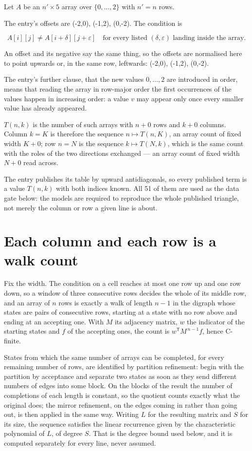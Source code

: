 \documentclass[11pt]{article}
\theoremstyle{definition}
\begin{document}
Let $A$ be an $n' \times 5$ array over $\{0,\dots,2\}$ with $n' = n$ rows.

The entry's offsets are (-2,0), (-1,2), (0,-2). The condition is

\[A[i][j] \ne A[i{+}\delta][j{+}\varepsilon]\quad\text{for every listed }(\delta,\varepsilon)\text{ landing inside the array.}\]

An offset and its negative say the same thing, so the offsets are normalised here to point upwards or, in the same row, leftwards: (-2,0), (-1,2), (0,-2).

The entry's further clause, that the new values $0,\dots,2$ are introduced in order, means that reading the array in row-major order the first occurrences of the values happen in increasing order: a value $v$ may appear only once every smaller value has already appeared.

$T(n,k)$ is the number of such arrays with $n + 0$ rows and $k + 0$ columns. Column $k = K$ is therefore the sequence $n \mapsto T(n,K)$, an array count of fixed width $K + 0$; row $n = N$ is the sequence $k \mapsto T(N,k)$, which is the same count with the roles of the two directions exchanged --- an array count of fixed width $N + 0$ read across.

The entry publishes its table by upward antidiagonals, so every published term is a value $T(n,k)$ with both indices known. All 51 of them are used as the data gate below: the models are required to reproduce the whole published triangle, not merely the column or row a given line is about.

\section{Each column and each row is a walk count}

Fix the width. The condition on a cell reaches at most one row up and one row down, so a window of three consecutive rows decides the whole of its middle row, and an array of $n$ rows is exactly a walk of length $n-1$ in the digraph whose states are pairs of consecutive rows, starting at a state with no row above and ending at an accepting one. With $M$ its adjacency matrix, $w$ the indicator of the starting states and $f$ of the accepting ones, the count is $w^{\mathsf T}M^{\,n-1}f$, hence C-finite.

States from which the same number of arrays can be completed, for every remaining number of rows, are identified by partition refinement: begin with the partition by acceptance and separate two states as soon as they send different numbers of edges into some block. On the blocks of the result the number of completions of each length is constant, so the quotient counts exactly what the original does; the mirror refinement, on the edges coming in rather than going out, is then applied in the same way. Writing $L$ for the resulting matrix and $S$ for its size, the sequence satisfies the linear recurrence given by the characteristic polynomial of $L$, of degree $S$. That is the degree bound used below, and it is computed separately for every line, never assumed.
\end{document}
